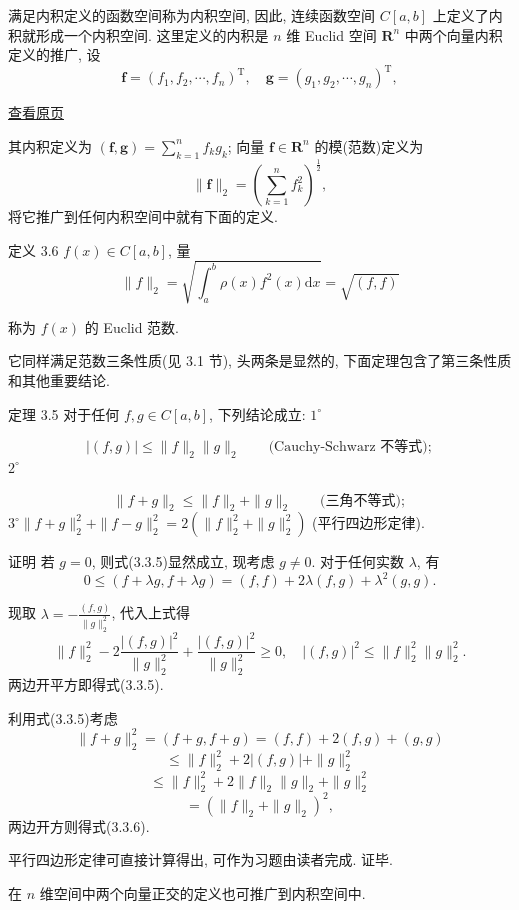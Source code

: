 \documentclass[
  10pt,
  fontset=fandol]{ctexart}
\begin{document}
满足内积定义的函数空间称为内积空间, 因此, 连续函数空间 \(C[a,b]\) 上定义了内积就形成一个内积空间. 这里定义的内积是 \(n\) 维 Euclid 空间 \(\mathbf{R}^n\) 中两个向量内积定义的推广, 设 \[
\boldsymbol{f} = (f_1, f_2, \cdots, f_n)^{\mathrm{T}}, \quad \boldsymbol{g} = (g_1, g_2, \cdots, g_n)^{\mathrm{T}},
\]

\href{../../source-images/pdf-066.jpeg}{查看原页}

其内积定义为 \((\boldsymbol{f}, \boldsymbol{g}) = \sum_{k=1}^{n} f_{k} g_{k}\); 向量 \(\boldsymbol{f} \in \mathbf{R}^{n}\) 的模(范数)定义为 \[
\| \boldsymbol{f} \|_{2} = \left( \sum_{k=1}^{n} f_{k}^{2} \right)^{\frac{1}{2}},
\] 将它推广到任何内积空间中就有下面的定义.

定义 3.6 \(f(x) \in C[a, b]\), 量 \[
\| f \|_{2} = \sqrt{\int_{a}^{b} \rho(x) f^{2}(x) \mathrm{d}x} = \sqrt{(f, f)} \tag{3.3.4}
\]

称为 \(f(x)\) 的 Euclid 范数.

它同样满足范数三条性质(见 3.1 节), 头两条是显然的, 下面定理包含了第三条性质和其他重要结论.

定理 3.5 对于任何 \(f, g \in C[a, b]\), 下列结论成立: \(1^{\circ}\)

\[
|(f,g)|\leqslant\|f\|_2\|g\|_2\qquad\text{(Cauchy-Schwarz 不等式)};\tag{3.3.5}
\] \(2^{\circ}\)

\[
\|f+g\|_2\leqslant\|f\|_2+\|g\|_2\qquad\text{(三角不等式)};\tag{3.3.6}
\] \(3^{\circ} \| f + g \|_{2}^{2} + \| f - g \|_{2}^{2} = 2(\| f \|_{2}^{2} + \| g \|_{2}^{2})\) (平行四边形定律).

证明 若 \(g=0\), 则式(3.3.5)显然成立, 现考虑 \(g \neq 0\). 对于任何实数 \(\lambda\), 有 \[
0 \leqslant (f + \lambda g, f + \lambda g) = (f, f) + 2\lambda(f, g) + \lambda^{2}(g, g).
\]

现取 \(\lambda = -\frac{(f, g)}{\| g \|_{2}^{2}}\), 代入上式得 \[
\| f \|_{2}^{2} - 2 \frac{|(f, g)|^{2}}{\| g \|_{2}^{2}} + \frac{|(f, g)|^{2}}{\| g \|_{2}^{2}} \geqslant 0, \quad |(f, g)|^{2} \leqslant \| f \|_{2}^{2} \| g \|_{2}^{2}.
\] 两边开平方即得式(3.3.5).

利用式(3.3.5)考虑 \[
\| f + g \|_{2}^{2} = (f + g, f + g) = (f, f) + 2(f, g) + (g, g)
\] \[
\leqslant \| f \|_{2}^{2} + 2 |(f, g)| + \| g \|_{2}^{2}
\] \[
\leqslant \| f \|_{2}^{2} + 2 \| f \|_{2} \| g \|_{2} + \| g \|_{2}^{2}
\] \[
= (\| f \|_{2} + \| g \|_{2})^{2},
\] 两边开方则得式(3.3.6).

平行四边形定律可直接计算得出, 可作为习题由读者完成. 证毕.

在 \(n\) 维空间中两个向量正交的定义也可推广到内积空间中.
\end{document}
